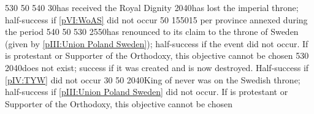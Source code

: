 %
%
{5}{30}{\EU@objAlliance}%
%
%
{}{50}{\EU@objSilesie}%
%
%
%
%
%
{5}{40}{\EU@objAlliance}%
%
{}{30}{\paysmajeurPrusse has received the Royal Dignity}%
%
{20}{40}{\paysmajeurAutriche has lost the imperial throne; half-success if
  \ref{pVI:WoAS} did not occur}%
%
{}{50}{\EU@objSilesie}%
%
%
%
{15}{50}{15 \VPs per province annexed during the period}%
%
{5}{40}{\EU@objAlliance}%
%
%
%
{}{50}{\EU@objSilesie}%
%
%
%
%
{5}{30}{\EU@objBaltiqueTrade}%
%
%
%
%
{25}{50}{\paysmajeurPologne has renounced to its claim to the throne of Sweden
  (given by \ref{pIII:Union Poland Sweden}); half-success if the event did not
  occur. If \paysmajeurPologne is protestant or Supporter of the Orthodoxy,
  this objective cannot be chosen}%
%
%
%
{5}{30}{\EU@objBaltiqueTrade}%
%
{20}{40}{\GE does not exist; success if it was created and is now
  destroyed. Half-success if \ref{pIV:TYW} did not occur}%
%
{}{30}{}%
%
{}{50}{\EU@objDMB}%
%
{20}{40}{King of  never was on the Swedish throne;
  half-success if \ref{pIII:Union Poland Sweden} did not occur. If
  \paysmajeurPologne is protestant or Supporter of the Orthodoxy, this
  objective cannot be chosen}%
